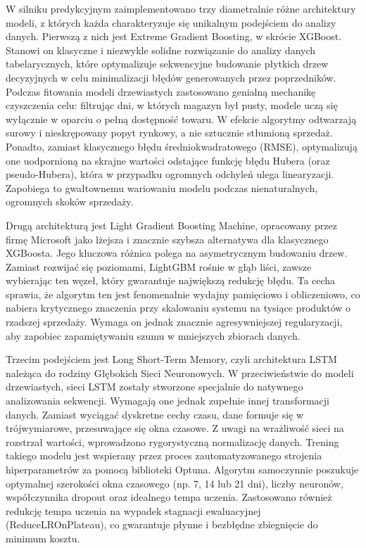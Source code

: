 \documentclass[12pt,a4paper]{article}
\begin{document}
W silniku predykcyjnym zaimplementowano trzy diametralnie różne architektury modeli, z których każda charakteryzuje się unikalnym podejściem do analizy danych. Pierwszą z nich jest Extreme Gradient Boosting, w skrócie XGBoost. Stanowi on klasyczne i niezwykle solidne rozwiązanie do analizy danych tabelarycznych, które optymalizuje sekwencyjne budowanie płytkich drzew decyzyjnych w celu minimalizacji błędów generowanych przez poprzedników. Podczas fitowania modeli drzewiastych zastosowano genialną mechanikę czyszczenia celu: filtrując dni, w których magazyn był pusty, modele uczą się wyłącznie w oparciu o pełną dostępność towaru. W efekcie algorytmy odtwarzają surowy i nieskrępowany popyt rynkowy, a nie sztucznie stłumioną sprzedaż. Ponadto, zamiast klasycznego błędu średniokwadratowego (RMSE), optymalizują one uodpornioną na skrajne wartości odstające funkcję błędu Hubera (oraz pseudo-Hubera), która w przypadku ogromnych odchyleń ulega linearyzacji. Zapobiega to gwałtownemu wariowaniu modelu podczas nienaturalnych, ogromnych skoków sprzedaży.

Drugą architekturą jest Light Gradient Boosting Machine, opracowany przez firmę Microsoft jako lżejsza i znacznie szybsza alternatywa dla klasycznego XGBoosta. Jego kluczowa różnica polega na asymetrycznym budowaniu drzew. Zamiast rozwijać się poziomami, LightGBM rośnie w głąb liści, zawsze wybierając ten węzeł, który gwarantuje największą redukcję błędu. Ta cecha sprawia, że algorytm ten jest fenomenalnie wydajny pamięciowo i obliczeniowo, co nabiera krytycznego znaczenia przy skalowaniu systemu na tysiące produktów o rzadszej sprzedaży. Wymaga on jednak znacznie agresywniejszej regularyzacji, aby zapobiec zapamiętywaniu szumu w mniejszych zbiorach danych.

Trzecim podejściem jest Long Short-Term Memory, czyli architektura LSTM należąca do rodziny Głębokich Sieci Neuronowych. W przeciwieństwie do modeli drzewiastych, sieci LSTM zostały stworzone specjalnie do natywnego analizowania sekwencji. Wymagają one jednak zupełnie innej transformacji danych. Zamiast wyciągać dyskretne cechy czasu, dane formuje się w trójwymiarowe, przesuwające się okna czasowe. Z uwagi na wrażliwość sieci na rozstrzał wartości, wprowadzono rygorystyczną normalizację danych. Trening takiego modelu jest wspierany przez proces zautomatyzowanego strojenia hiperparametrów za pomocą biblioteki Optuna. Algorytm samoczynnie poszukuje optymalnej szerokości okna czasowego (np. 7, 14 lub 21 dni), liczby neuronów, współczynnika dropout oraz idealnego tempa uczenia. Zastosowano również redukcję tempa uczenia na wypadek stagnacji ewaluacyjnej (ReduceLROnPlateau), co gwarantuje płynne i bezbłędne zbiegnięcie do minimum kosztu.
\end{document}

